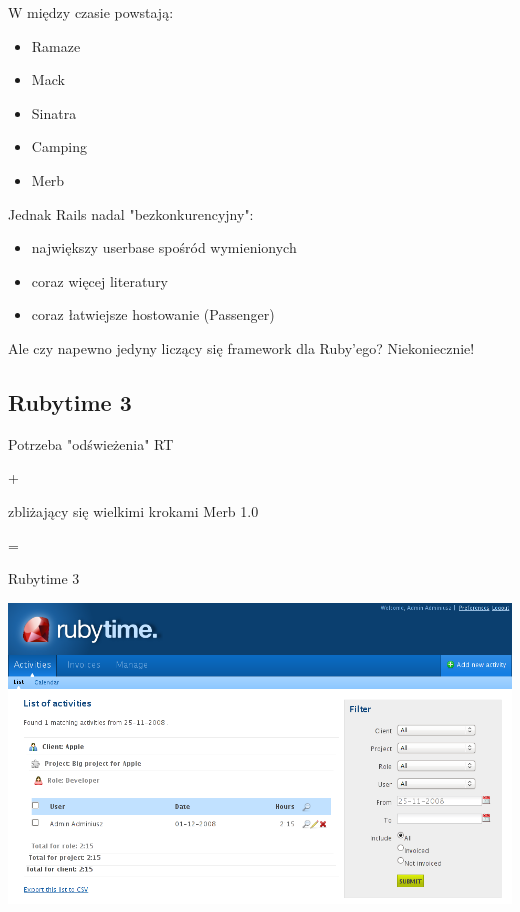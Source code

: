 \documentclass[19pt]{beamer}
\begin{document}
\begin{center}
\begin{frame}
W między czasie powstają:
\begin{itemize}
\item Ramaze
\item Mack
\item Sinatra
\item Camping
\item Merb
\end{itemize}
\end{frame}

%

\begin{frame}
Jednak Rails nadal "bezkonkurencyjny":
\begin{itemize}
\item największy userbase spośród wymienionych
\item coraz więcej literatury
\item coraz łatwiejsze hostowanie (Passenger)
\end{itemize}
\end{frame}

\begin{frame}
Ale czy napewno jedyny liczący się framework dla Ruby'ego? Niekoniecznie!
\end{frame}

\subsection{Rubytime 3}

\begin{frame}
Potrzeba "odświeżenia" RT

+ 

zbliżający się wielkimi krokami Merb 1.0 

= 

Rubytime 3
\end{frame}

\begin{frame}
\includegraphics[width=1.0\textwidth]{rt-full.png} 
\end{frame}


\end{center}
\end{document}
